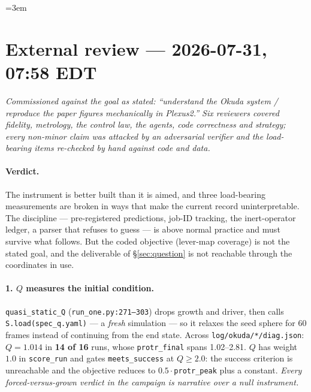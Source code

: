 \documentclass[11pt]{article}
\newcommand{\code}[1]{\texttt{#1}}
\begin{document}
\clearpage
{}
{\footnotesize\setlength{\parskip}{4pt}\sloppy\emergencystretch=3em
\section{External review --- 2026-07-31, 07:58 EDT}
\label{sec:extreview}

\emph{Commissioned against the goal as stated: ``understand the Okuda system / reproduce the paper
figures mechanically in Plexus2.'' Six reviewers covered fidelity, metrology, the control law, the
agents, code correctness and strategy; every non-minor claim was attacked by an adversarial
verifier and the load-bearing items re-checked by hand against code and data.}

\paragraph{Verdict.} The instrument is better built than it is aimed, and three load-bearing
measurements are broken in ways that make the current record uninterpretable. The discipline ---
pre-registered predictions, job-ID tracking, the inert-operator ledger, a parser that refuses to
guess --- is above normal practice and must survive what follows. But the coded objective
(lever-map coverage) is not the stated goal, and the deliverable of \S\ref{sec:question} is not
reachable through the coordinates in use.

\paragraph{1. $Q$ measures the initial condition.} \code{quasi\_static\_Q}
(\code{run\_one.py:271--303}) drops growth and driver, then calls \code{S.load(spec\_q.yaml)} --- a
\emph{fresh} simulation --- so it relaxes the seed sphere for 60 frames instead of continuing from
the end state. Across \code{log/okuda/*/diag.json}: $Q=1.014$ in \textbf{14 of 16} runs, whose
\code{protr\_final} spans 1.02--2.81. $Q$ has weight $1.0$ in \code{score\_run} and gates
\code{meets\_success} at $Q\geq2.0$: the success criterion is unreachable and the objective reduces
to $0.5\cdot$\code{protr\_peak} plus a constant. \emph{Every forced-versus-grown verdict in the
campaign is narrative over a null instrument.}

}
\end{document}
